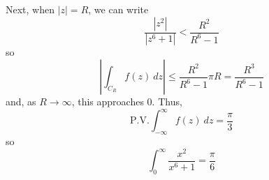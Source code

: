 \documentclass{article}
\begin{document}
Next, when $|z| = R$, we can write
\[
	\frac{|z^2|}{|z^6 + 1|} < \frac{R^2}{R^6 - 1}
\]
so 
\[
	\left| \int_{C_R} f(z)~dz \right| 
	\le \frac{R^2}{R^6 - 1} \pi R
	= \frac{R^3}{R^6 - 1}
\]
and, as $R \to \infty$, this approaches $0$. Thus,
\[
	\text{P.V.} \int_{-\infty}^\infty f(z)~dz
	= \frac{\pi}{3}
\]
so
\[
	\int_0^\infty \frac{x^2}{x^6 + 1} = \frac{\pi}{6}
\]
\end{document}
